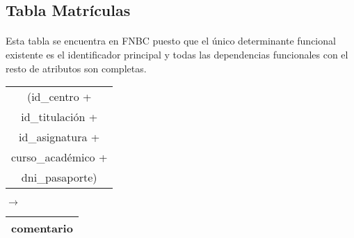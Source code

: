 \subsection{Tabla Matrículas}

  \paragraph{}Esta tabla se encuentra en FNBC puesto que el único determinante
  funcional existente es el identificador principal y todas las dependencias
  funcionales con el resto de atributos son completas.

 \begin{center}
    \begin{minipage}{4.2cm}{\begin{flushright}\begin{tabular}{ | c | }
                  \hline
                  (id\_centro + \\
                  id\_titulación + \\
                  id\_asignatura + \\
                  curso\_académico + \\
                  dni\_pasaporte) \\
                  \hline
                 \end{tabular}\end{flushright} }
    \end{minipage}
    \begin{minipage}{0.7cm}{$\longrightarrow$}
    \end{minipage}
    \begin{minipage}{5.9cm}{\begin{tabular}{ | c | }
                  \hline
                  comentario \\
                  \hline
                 \end{tabular} }
    \end{minipage}
  \end{center}
